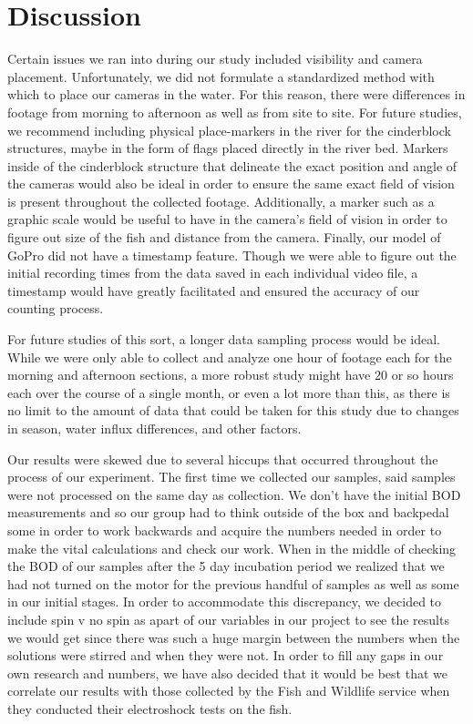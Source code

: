 \documentclass{article}\usepackage[]{graphicx}\usepackage[]{color}
\begin{document}
\section{Discussion}


Certain issues we ran into during our study included visibility and camera placement. Unfortunately, we did not formulate a standardized method with which to place our cameras in the water. For this reason, there were differences in footage from morning to afternoon as well as from site to site. For future studies, we recommend including physical place-markers in the river for the cinderblock structures, maybe in the form of flags placed directly in the river bed. Markers inside of the cinderblock structure that delineate the exact position and angle of the cameras would also be ideal in order to ensure the same exact field of vision is present throughout the collected footage. Additionally, a marker such as a graphic scale would be useful to have in the camera’s field of vision in order to figure out size of the fish and distance from the camera. Finally, our model of GoPro did not have a timestamp feature. Though we were able to figure out the initial recording times from the data saved in each individual video file, a timestamp would have greatly facilitated and ensured the accuracy of our counting process.

For future studies of this sort, a longer data sampling process would be ideal. While we were only able to collect and analyze one hour of footage each for the morning and afternoon sections, a more robust study might have 20 or so hours each over the course of a single month, or even a lot more than this, as there is no limit to the amount of data that could be taken for this study due to changes in season, water influx differences, and other factors.


Our results were skewed due to several hiccups that occurred throughout the process of our experiment. The first time we collected our samples, said samples were not processed on the same day as collection. 
We don’t have the initial BOD measurements and so our group had to think outside of the box and backpedal some in order to work backwards and acquire the numbers needed in order to make the vital calculations and check our work.
When in the middle of checking the BOD of our samples after the 5 day incubation period we realized that we had not turned on the motor for the previous handful of samples as well as some in our initial stages. In order to accommodate this discrepancy, we decided to include spin v no spin as apart of our variables in our project to see the results we would get since there was such a huge margin between the numbers when the solutions were stirred and when they were not.
In order to fill any gaps in our own research and numbers, we have also decided that it would be best that we correlate our results with those collected by the Fish and Wildlife service when they conducted their electroshock tests on the fish. 
\end{document}
